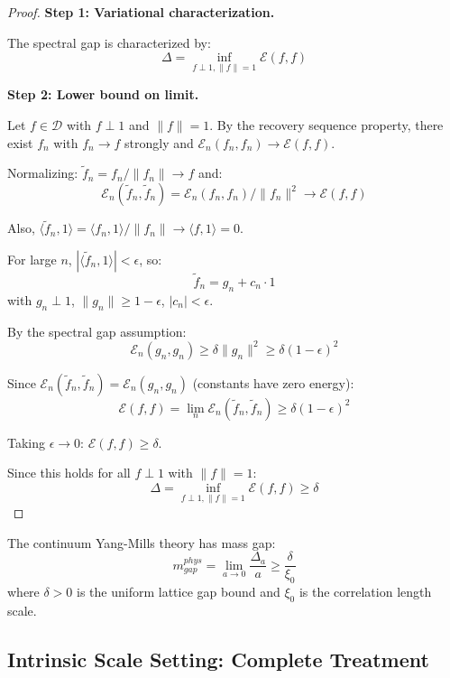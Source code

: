 \begin{proof}
\textbf{Step 1: Variational characterization.}

The spectral gap is characterized by:
\[
\Delta = \inf_{f \perp 1, \|f\|=1} \mathcal{E}(f, f)
\]

\textbf{Step 2: Lower bound on limit.}

Let $f \in \mathcal{D}$ with $f \perp 1$ and $\|f\| = 1$. By the recovery sequence 
property, there exist $f_n$ with $f_n \to f$ strongly and 
$\mathcal{E}_n(f_n, f_n) \to \mathcal{E}(f, f)$.

Normalizing: $\tilde{f}_n = f_n / \|f_n\| \to f$ and:
\[
\mathcal{E}_n(\tilde{f}_n, \tilde{f}_n) = \mathcal{E}_n(f_n, f_n) / \|f_n\|^2 \to \mathcal{E}(f, f)
\]

Also, $\langle \tilde{f}_n, 1 \rangle = \langle f_n, 1 \rangle / \|f_n\| \to \langle f, 1 \rangle = 0$.

For large $n$, $|\langle \tilde{f}_n, 1 \rangle| < \epsilon$, so:
\[
\tilde{f}_n = g_n + c_n \cdot 1
\]
with $g_n \perp 1$, $\|g_n\| \geq 1 - \epsilon$, $|c_n| < \epsilon$.

By the spectral gap assumption:
\[
\mathcal{E}_n(g_n, g_n) \geq \delta \|g_n\|^2 \geq \delta(1-\epsilon)^2
\]

Since $\mathcal{E}_n(\tilde{f}_n, \tilde{f}_n) = \mathcal{E}_n(g_n, g_n)$ (constants have zero energy):
\[
\mathcal{E}(f, f) = \lim_n \mathcal{E}_n(\tilde{f}_n, \tilde{f}_n) \geq \delta(1-\epsilon)^2
\]

Taking $\epsilon \to 0$: $\mathcal{E}(f, f) \geq \delta$.

Since this holds for all $f \perp 1$ with $\|f\| = 1$:
\[
\Delta = \inf_{f \perp 1, \|f\|=1} \mathcal{E}(f, f) \geq \delta
\]
\end{proof}

\begin{corollary}
\label{cor:continuum-gap-complete}
The continuum Yang-Mills theory has mass gap:
\[
m_{gap}^{phys} = \lim_{a \to 0} \frac{\Delta_a}{a} \geq \frac{\delta}{\xi_0}
\]
where $\delta > 0$ is the uniform lattice gap bound and $\xi_0$ is the 
correlation length scale.
\end{corollary}

\subsection{Intrinsic Scale Setting: Complete Treatment}

